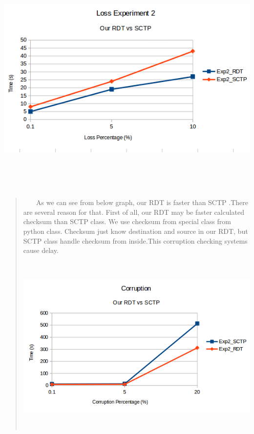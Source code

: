 \documentclass[12pt]{article}
\begin{document}
\includegraphics[width = 180mm, height = 120mm]{LossExperiment2}

\begin{quote}
$\ \  \ \ \ \ \ $ As we can see from below graph, our RDT is faster than SCTP .There are several reason for that. First of all, our RDT may be faster calculated checksum than SCTP class. We use checksum from special class from python class. Checksum just know destination and source in our RDT, but SCTP class handle checksum from inside.This corruption checking systems cause delay.



\includegraphics[width = 180mm, height = 90mm]{Corruption}
\end{quote}
\end{document}
